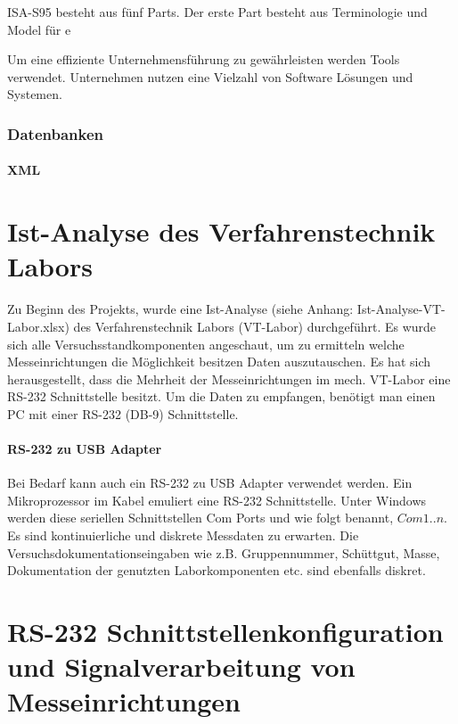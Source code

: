 \documentclass[
fontsize=12pt, 
paper=a4, 
BCOR=10mm, 
twoside=false,
 DIV=10, 
 headsepline, 
 footsepline
 ]{scrartcl}
\begin{document}
ISA-S95 besteht aus fünf Parts. Der erste Part besteht aus Terminologie und Model für e

Um eine effiziente Unternehmensführung zu gewährleisten werden Tools verwendet. Unternehmen nutzen eine Vielzahl von Software Lösungen und Systemen. 

\subsubsection{Datenbanken}

\paragraph{XML}







%
\section{Ist-Analyse des Verfahrenstechnik Labors}

Zu Beginn des Projekts, wurde eine Ist-Analyse (siehe Anhang: Ist-Analyse-VT-Labor.xlsx) des Verfahrenstechnik Labors (VT-Labor) durchgeführt. Es wurde sich alle Versuchsstandkomponenten angeschaut, um zu ermitteln welche Messeinrichtungen die Möglichkeit besitzen Daten auszutauschen. Es hat sich herausgestellt, dass die Mehrheit der Messeinrichtungen im mech. VT-Labor eine RS-232 Schnittstelle besitzt. Um die Daten zu empfangen, benötigt man einen PC mit einer RS-232 (DB-9) Schnittstelle. 

\paragraph{RS-232 zu USB Adapter} Bei Bedarf kann auch ein RS-232 zu USB Adapter verwendet werden. Ein Mikroprozessor im Kabel emuliert eine RS-232 Schnittstelle. Unter Windows werden diese seriellen Schnittstellen Com Ports und wie folgt benannt, $Com 1 .. n$.\\

Es sind kontinuierliche und diskrete Messdaten zu erwarten. Die Versuchsdokumentationseingaben wie z.B. Gruppennummer, Schüttgut, Masse, Dokumentation der genutzten Laborkomponenten etc. sind ebenfalls diskret.


\section{RS-232 Schnittstellenkonfiguration und Signalverarbeitung von  Mess\-einrichtungen}
\end{document}
